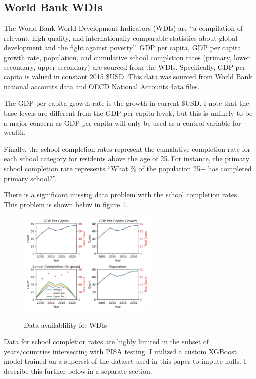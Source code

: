 \documentclass[11pt]{article}
\begin{document}
\subsection{World Bank WDIs}
The World Bank World Development Indicators (WDIs) are ``a compilation of relevant, high-quality, and internationally comparable statistics about global development and the fight against poverty''. GDP per capita, GDP per capita growth rate, population, and cumulative school completion rates (primary, lower secondary, upper secondary) are sourced from the WDIs.
Specifically, GDP per capita is valued in constant 2015 \$USD. This data was sourced from World Bank national accounts data and OECD National Accounts data files.

The GDP per capita growth rate is the growth in current \$USD. I note that the base levels are different from the GDP per capita levels, but this is unlikely to be a major concern as GDP per capita will only be used as a control variable for wealth.

Finally, the school completion rates represent the cumulative completion rate for each school category for residents above the age of 25. For instance, the primary school completion rate represents ``What \% of the population 25+ has completed primary school?''.

There is a significant missing data problem with the school completion rates. This problem is shown below in figure \ref{fig:wdi}.
\begin{figure}
    \caption{Data availablility for WDIs}
    \centering
    \includegraphics[width=0.6\textwidth]{../charts/wdi-count.png}
    \label{fig:wdi}
\end{figure}

Data for school completion rates are highly limited in the subset of years/countries intersecting with PISA testing. I utilized a custom XGBoost model trained on a superset of the dataset used in this paper to impute nulls. I describe this further below in a separate section.
\end{document}
